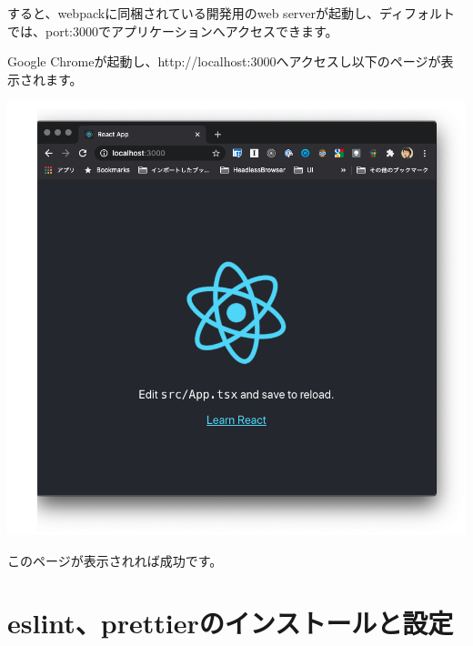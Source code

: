 すると、webpackに同梱されている開発用のweb serverが起動し、ディフォルトでは、port:3000でアプリケーションへアクセスできます。

\def\startercodeblockfontsize{}
\begin{starterterminal}[]{}\end{starterterminal}

Google Chromeが起動し、http://localhost:3000へアクセスし以下のページが表示されます。

\begin{reviewimage}[H]%
\includegraphics[width=1.0\maxwidth]{./images/02-create-react-app/02_cra_start.png}%
\label{image:02-create-react-app:02_cra_start}
\end{reviewimage}

このページが表示されれば成功です。

\section{eslint、prettierのインストールと設定}
\keeplastskip{
  \label{sec:2-3}
  \label{sec-03lint}
  \par\nobreak
}

